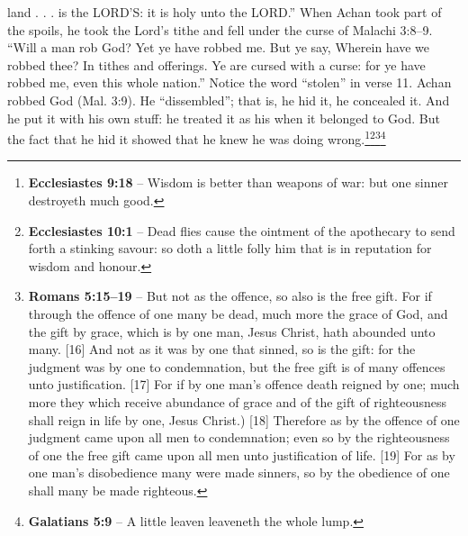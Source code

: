{land . . . is the LORD’S: it is holy unto the
LORD.” When Achan took part of the spoils,
he took the Lord’s tithe and fell under the curse
of Malachi 3:8–9.
“Will a man rob God? Yet ye have
robbed me. But ye say, Wherein have we
robbed thee? In tithes and offerings. Ye are
cursed with a curse: for ye have robbed me,
even this whole nation.”
Notice the word “stolen” in verse 11.
Achan robbed God (Mal. 3:9). He
“dissembled”; that is, he hid it, he concealed
it. And he put it with his own stuff: he treated it
as his when it belonged to God. But the fact
that he hid it showed that he knew he was doing
wrong.}\footnote{\textbf{Ecclesiastes 9:18} -- Wisdom is better than weapons of war: but one sinner destroyeth much good.}\footnote{\textbf{Ecclesiastes 10:1} -- Dead flies cause the ointment of the apothecary to send forth a stinking savour: so doth a little folly him that is in reputation for wisdom and honour.}\footnote{\textbf{Romans 5:15--19} -- But not as the offence, so also is the free gift. For if through the offence of one many be dead, much more the grace of God, and the gift by grace, which is by one man, Jesus Christ, hath abounded unto many. [16] And not as it was by one that sinned, so is the gift: for the judgment was by one to condemnation, but the free gift is of many offences unto justification. 
[17]  For if by one man's offence death reigned by one; much more they which receive abundance of grace and of the gift of righteousness shall reign in life by one, Jesus Christ.) [18] Therefore as by the offence of one judgment came upon all men to condemnation; even so by the righteousness of one the free gift came upon all men unto justification of life. [19]  For as by one man's disobedience many were made sinners, so by the obedience of one shall many be made righteous. }\footnote{\textbf{Galatians 5:9} -- A little leaven leaveneth the whole lump.}
